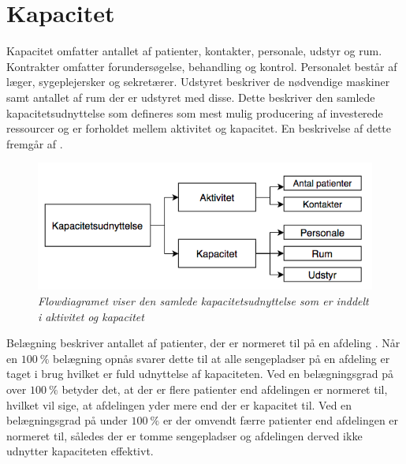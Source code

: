 \section{Kapacitet}
Kapacitet omfatter antallet af patienter, kontakter, personale, udstyr og rum. Kontrakter omfatter forundersøgelse, behandling og kontrol. Personalet består af læger, sygeplejersker og sekretærer. Udstyret beskriver de nødvendige maskiner samt antallet af rum der er udstyret med disse. Dette beskriver den samlede kapacitetsudnyttelse som defineres som  mest mulig producering af investerede ressourcer og er forholdet mellem aktivitet og kapacitet. \cite{Company2013} En beskrivelse af dette fremgår af . 

\begin{figure}[H]
	\flushleft 
	\centering
	\includegraphics[scale=.45]{figures/Kapacitetsudnyttelse.png}
	\label{kapacitet}
	\flushleft
	\textit{Flowdiagramet viser den samlede kapacitetsudnyttelse som er inddelt i aktivitet og kapacitet \cite{Company2013}}
\end{figure}


\noindent

Belægning beskriver antallet af patienter, der er normeret til på en afdeling \cite{Heidmann2014}. Når en $100~\%$ belægning opnås svarer dette til at alle sengepladser på en afdeling er taget i brug hvilket er fuld udnyttelse af kapaciteten. Ved en belægningsgrad på over $100~\%$ betyder det, at der er flere patienter end afdelingen er normeret til, hvilket vil sige, at afdelingen yder mere end der er kapacitet til. Ved en belægningsgrad på under $100~\%$ er der omvendt færre patienter end afdelingen er normeret til, således der er tomme sengepladser og afdelingen derved ikke udnytter kapaciteten effektivt. \cite{Pauly1986} 

